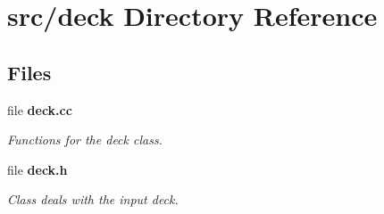 \section{src/deck Directory Reference}
\label{dir_80b2bdf578a5290e4aa877db1f8440ce}
\subsection*{Files}
\begin{DoxyCompactItemize}
\item 
file {\bf deck.\-cc}
\begin{DoxyCompactList}\small\item\em Functions for the deck class. \end{DoxyCompactList}\item 
file {\bf deck.\-h}
\begin{DoxyCompactList}\small\item\em Class deals with the input deck. \end{DoxyCompactList}\end{DoxyCompactItemize}
